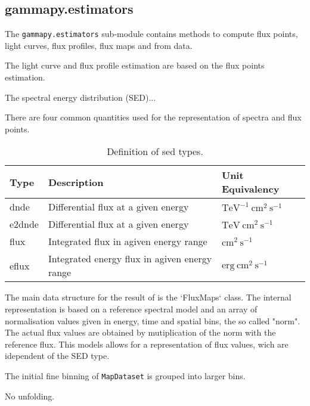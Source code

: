 \subsection{gammapy.estimators}
\label{ssec:gammapy-estimators}
The \verb|gammapy.estimators| sub-module contains methods to compute flux
points, light curves, flux profiles, flux maps and  from data.

The light curve and flux profile estimation are based on the
flux points estimation.

The spectral energy distribution (SED)...

There are four common quantities used for the representation of
\gammaray spectra and flux points.

\begin{table*}
    \begin{center}
        \begin{tabular}{lll}
         \hline
         Type & Description & Unit Equivalency \\
         \hline
         dnde & Differential flux at a given energy & $\mathrm{TeV^{-1}~cm^{2}~s^{-1}}$ \\
         e2dnde & Differential flux at a given energy  & $\mathrm{TeV~cm^{2}~s^{-1}}$ \\
         flux & Integrated flux in agiven energy range & $\mathrm{cm^{2}~s^{-1}}$ \\
         eflux & Integrated energy flux in agiven energy range & $\mathrm{erg~cm^{2}~s^{-1}}$
        \end{tabular}
    \end{center}
    \label{tab:sed_types}
    \caption{Definition of sed types.}
\end{table*}



The main data structure for the result of is the `FluxMaps` class.
The internal representation is based on a reference spectral model
and an array of normalisation values given in energy, time and spatial bins,
the so called "norm".
The actual flux values are obtained by mutiplication of the norm with the
reference flux.
This models allows for a representation of flux values, wich are idependent
of the SED type.


The initial fine binning of \verb|MapDataset| is grouped into larger bins.



No unfolding.

